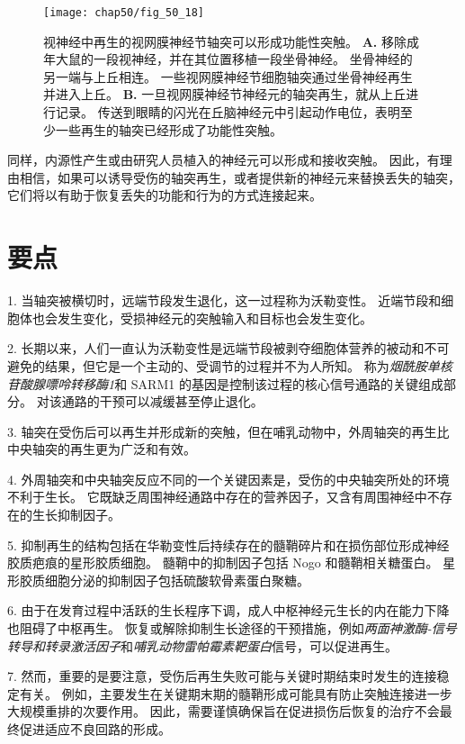 \begin{figure}[htbp]
	\centering
	\texttt{[image: chap50/fig\_50\_18]}
	\caption{视神经中再生的视网膜神经节轴突可以形成功能性突触\cite{keirstead1989electrophysiologic}。
		\textbf{A.} 移除成年大鼠的一段视神经，并在其位置移植一段坐骨神经。
		坐骨神经的另一端与上丘相连。
		一些视网膜神经节细胞轴突通过坐骨神经再生并进入上丘。
		\textbf{B.} 一旦视网膜神经节神经元的轴突再生，就从上丘进行记录。
		传送到眼睛的闪光在丘脑神经元中引起动作电位，表明至少一些再生的轴突已经形成了功能性突触。}
	\label{fig:50_18}
\end{figure}


同样，内源性产生或由研究人员植入的神经元可以形成和接收突触。
因此，有理由相信，如果可以诱导受伤的轴突再生，或者提供新的神经元来替换丢失的轴突，它们将以有助于恢复丢失的功能和行为的方式连接起来。



\section{要点}

1. 当轴突被横切时，远端节段发生退化，这一过程称为沃勒变性。
近端节段和细胞体也会发生变化，受损神经元的突触输入和目标也会发生变化。


2. 长期以来，人们一直认为沃勒变性是远端节段被剥夺细胞体营养的被动和不可避免的结果，但它是一个主动的、受调节的过程并不为人所知。
称为\textit{烟酰胺单核苷酸腺嘌呤转移酶1}和 SARM1 的基因是控制该过程的核心信号通路的关键组成部分。
对该通路的干预可以减缓甚至停止退化。 


3. 轴突在受伤后可以再生并形成新的突触，但在哺乳动物中，外周轴突的再生比中央轴突的再生更为广泛和有效。


4. 外周轴突和中央轴突反应不同的一个关键因素是，受伤的中央轴突所处的环境不利于生长。
它既缺乏周围神经通路中存在的营养因子，又含有周围神经中不存在的生长抑制因子。


5. 抑制再生的结构包括在华勒变性后持续存在的髓鞘碎片和在损伤部位形成神经胶质疤痕的星形胶质细胞。
髓鞘中的抑制因子包括 Nogo 和髓鞘相关糖蛋白。
星形胶质细胞分泌的抑制因子包括硫酸软骨素蛋白聚糖。
 

6. 由于在发育过程中活跃的生长程序下调，成人中枢神经元生长的内在能力下降也阻碍了中枢再生。
恢复或解除抑制生长途径的干预措施，例如\textit{两面神激酶-信号转导和转录激活因子}和\textit{哺乳动物雷帕霉素靶蛋白}信号，可以促进再生。


7. 然而，重要的是要注意，受伤后再生失败可能与关键时期结束时发生的连接稳定有关。
例如，主要发生在关键期末期的髓鞘形成可能具有防止突触连接进一步大规模重排的次要作用。
因此，需要谨慎确保旨在促进损伤后恢复的治疗不会最终促进适应不良回路的形成。 


